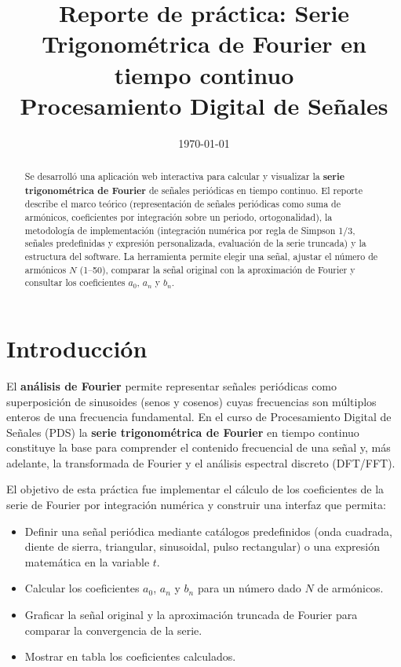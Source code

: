 \documentclass[12pt,a4paper]{article}
\title{\textbf{Reporte de práctica: Serie Trigonométrica de Fourier en tiempo continuo}\\[0.5em]
\large Procesamiento Digital de Señales}
\date{\today}
\begin{document}
\maketitle

\begin{abstract}
Se desarrolló una aplicación web interactiva para calcular y visualizar la \textbf{serie trigonométrica de Fourier} de señales periódicas en tiempo continuo. El reporte describe el marco teórico (representación de señales periódicas como suma de armónicos, coeficientes por integración sobre un periodo, ortogonalidad), la metodología de implementación (integración numérica por regla de Simpson 1/3, señales predefinidas y expresión personalizada, evaluación de la serie truncada) y la estructura del software. La herramienta permite elegir una señal, ajustar el número de armónicos \(N\) (1--50), comparar la señal original con la aproximación de Fourier y consultar los coeficientes \(a_0\), \(a_n\) y \(b_n\).
\end{abstract}

\tableofcontents
\newpage

\section{Introducción}

El \textbf{análisis de Fourier} permite representar señales periódicas como superposición de sinusoides (senos y cosenos) cuyas frecuencias son múltiplos enteros de una frecuencia fundamental. En el curso de Procesamiento Digital de Señales (PDS) la \textbf{serie trigonométrica de Fourier} en tiempo continuo constituye la base para comprender el contenido frecuencial de una señal y, más adelante, la transformada de Fourier y el análisis espectral discreto (DFT/FFT).

El objetivo de esta práctica fue implementar el cálculo de los coeficientes de la serie de Fourier por integración numérica y construir una interfaz que permita:
\begin{itemize}[noitemsep]
  \item Definir una señal periódica mediante catálogos predefinidos (onda cuadrada, diente de sierra, triangular, sinusoidal, pulso rectangular) o una expresión matemática en la variable \(t\).
  \item Calcular los coeficientes \(a_0\), \(a_n\) y \(b_n\) para un número dado \(N\) de armónicos.
  \item Graficar la señal original y la aproximación truncada de Fourier para comparar la convergencia de la serie.
  \item Mostrar en tabla los coeficientes calculados.
\end{itemize}
\end{document}
